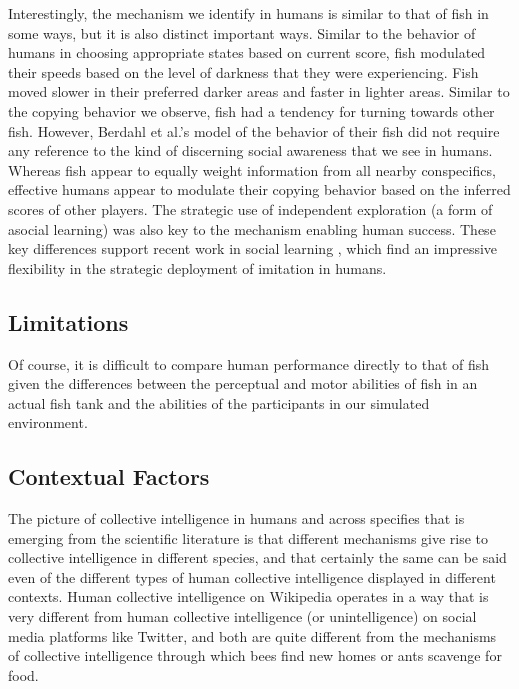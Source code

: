 \documentclass[12pt,letterpaper]{article}
\begin{document}
Interestingly, the mechanism we identify in humans is similar to that
of fish in some ways, but it is also distinct important ways.  Similar
to the behavior of humans in choosing appropriate states based on
current score, fish modulated their speeds based on the level of
darkness that they were experiencing.  Fish moved slower in their
preferred darker areas and faster in lighter areas.  Similar to the
copying behavior we observe, fish had a tendency for turning towards
other fish.  However, Berdahl et al.'s model of the behavior of their
fish did not require any reference to the kind of discerning social
awareness that we see in humans.  Whereas fish appear to equally
weight information from all nearby conspecifics, effective humans
appear to modulate their copying behavior based on the inferred scores
of other players. The strategic use of independent exploration (a form
of asocial learning) was also key to the mechanism enabling human
success. These key differences support recent work in social learning
\cite{wisdom_social_2013, mcelreath_beyond_2008}, which find an
impressive flexibility in the strategic deployment of imitation in
humans. 

\subsection{Limitations}

Of course, it is difficult to compare human performance
directly to that of fish given the differences between the perceptual
and motor abilities of fish in an actual fish tank and the abilities
of the participants in our simulated environment.  



\subsection{Contextual Factors}

The picture of collective intelligence in humans and across specifies that is emerging from the scientific literature is that different mechanisms give rise to collective intelligence in different species, and that certainly the same can be said even of the different types of human collective intelligence displayed in different contexts.  Human collective intelligence on Wikipedia operates in a way that is very different from human collective intelligence (or unintelligence) on social media platforms like Twitter, and both are quite different from the mechanisms of collective intelligence through which bees find new homes or ants scavenge for food. 
\end{document}
